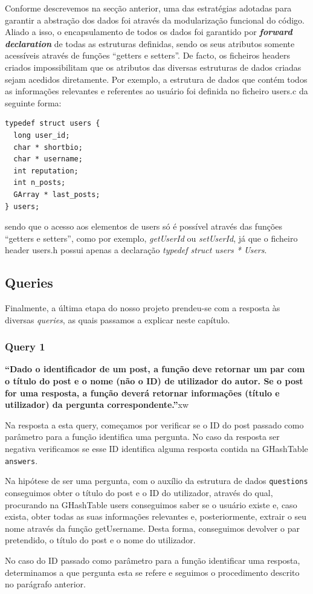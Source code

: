 \documentclass[a4paper]{article}
\begin{document}
Conforme descrevemos na secção anterior, uma das estratégias adotadas para garantir
a abstração dos dados foi através da modularização funcional do código.
Aliado a isso, o encapsulamento de todos os dados foi garantido por \textbf{\textit{forward declaration}}
de todas as estruturas definidas, sendo os seus atributos somente acessíveis através
de funções ``getters e setters''. De facto, os ficheiros headers criados impossibilitam
que os atributos das diversas estruturas de dados criadas sejam acedidos diretamente.
Por exemplo, a estrutura de dados que contém todos as informações relevantes e
referentes ao usuário foi definida no ficheiro users.c da seguinte forma:

\begin{verbatim}
typedef struct users {
  long user_id;
  char * shortbio;
  char * username;
  int reputation;
  int n_posts;
  GArray * last_posts;
} users;
\end{verbatim}

sendo que o acesso aos elementos de users só é possível através das funções
``getters e setters'', como por exemplo, \textit{getUserId} ou
\textit{setUserId}, já que o ficheiro header users.h possui apenas a declaração
\textit{typedef struct users * Users}.


\subsection{Queries}
\label{sec:queries}

Finalmente, a última etapa do nosso projeto prendeu-se com a resposta às diversas
\textit{queries}, as quais passamos a explicar neste capítulo.


\subsubsection*{Query 1}
\label{sec:query1}

\textbf{“Dado o identificador de um post, a função deve retornar
um par com o título do post e o nome (não o ID) de utilizador do autor. Se o post
for uma resposta, a função deverá retornar informações (título e utilizador)
da pergunta correspondente.”}xw

Na resposta a esta query, começamos por verificar se o ID do post passado como
parâmetro  para a função identifica uma pergunta. No caso da resposta ser negativa
verificamos se esse ID identifica alguma resposta contida
na GHashTable \texttt{answers}. \par
Na hipótese de ser uma pergunta, com o auxílio da estrutura de dados \texttt{questions}
conseguimos obter o título do post e o ID do utilizador, através do qual, procurando
na GHashTable users conseguimos saber se o usuário existe e, caso exista, obter
todas as suas informações relevantes e, posteriormente, extrair o seu nome através
da função getUsername. Desta forma, conseguimos devolver o par
pretendido, o título do post e o nome do utilizador. \par
No caso do ID passado como parâmetro para a função identificar uma resposta, determinamos
a que pergunta esta se refere e seguimos o procedimento descrito no parágrafo anterior.
\end{document}
